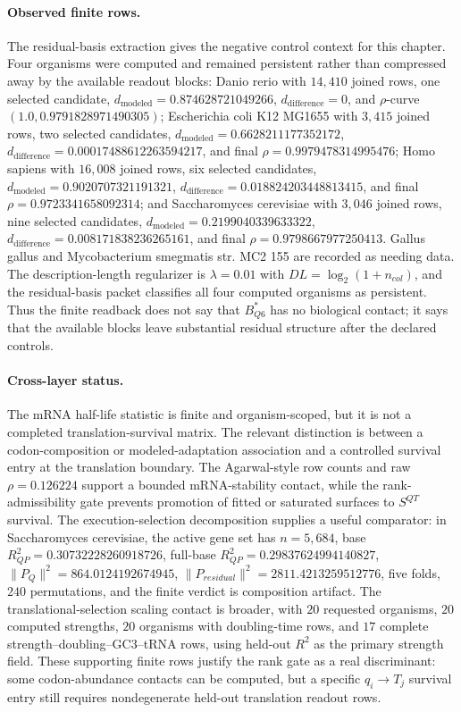 \paragraph{Observed finite rows.}
The residual-basis extraction gives the negative control context for this chapter.  Four organisms were computed and remained persistent rather than compressed away by the available readout blocks: Danio rerio with $14{,}410$ joined rows, one selected candidate, $d_{\mathrm{modeled}}=0.874628721049266$, $d_{\mathrm{difference}}=0$, and $\rho$-curve $(1.0,0.9791828971490305)$; Escherichia coli K12 MG1655 with $3{,}415$ joined rows, two selected candidates, $d_{\mathrm{modeled}}=0.6628211177352172$, $d_{\mathrm{difference}}=0.00017488612263594217$, and final $\rho=0.9979478314995476$; Homo sapiens with $16{,}008$ joined rows, six selected candidates, $d_{\mathrm{modeled}}=0.9020707321191321$, $d_{\mathrm{difference}}=0.018824203448813415$, and final $\rho=0.9723341658092314$; and Saccharomyces cerevisiae with $3{,}046$ joined rows, nine selected candidates, $d_{\mathrm{modeled}}=0.2199040339633322$, $d_{\mathrm{difference}}=0.008171838236265161$, and final $\rho=0.9798667977250413$.  Gallus gallus and Mycobacterium smegmatis str. MC2 155 are recorded as needing data.  The description-length regularizer is $\lambda=0.01$ with $DL=\log_2(1+n_{col})$, and the residual-basis packet classifies all four computed organisms as persistent.  Thus the finite readback does not say that $B^*_{Q6}$ has no biological contact; it says that the available blocks leave substantial residual structure after the declared controls.

\paragraph{Cross-layer status.}
The mRNA half-life statistic is finite and organism-scoped, but it is not a completed translation-survival matrix.  The relevant distinction is between a codon-composition or modeled-adaptation association and a controlled survival entry at the translation boundary.  The Agarwal-style row counts and raw $\rho=0.126224$ support a bounded mRNA-stability contact, while the rank-admissibility gate prevents promotion of fitted or saturated surfaces to $S^{QT}$ survival.  The execution-selection decomposition supplies a useful comparator: in Saccharomyces cerevisiae, the active gene set has $n=5{,}684$, base $R^2_{QP}=0.30732228260918726$, full-base $R^2_{QP}=0.29837624994140827$, $\|P_Q\|^2=864.0124192674945$, $\|P_{residual}\|^2=2811.4213259512776$, five folds, $240$ permutations, and the finite verdict is composition artifact.  The translational-selection scaling contact is broader, with $20$ requested organisms, $20$ computed strengths, $20$ organisms with doubling-time rows, and $17$ complete strength--doubling--GC3--tRNA rows, using held-out $R^2$ as the primary strength field.  These supporting finite rows justify the rank gate as a real discriminant: some codon-abundance contacts can be computed, but a specific $q_i\to T_j$ survival entry still requires nondegenerate held-out translation readout rows.

